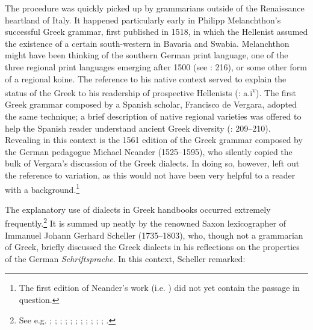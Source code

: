 The procedure was quickly picked up by grammarians outside of the Renaissance heartland of Italy. It happened particularly early in Philipp Melanchthon’s successful Greek grammar, first published in 1518, in which the  Hellenist assumed the existence of a certain south-western   in Bavaria and Swabia. Melanchthon might have been thinking of the southern German print language, one of the three regional print languages emerging after 1500 (see \citealt{Mattheier2003}: 216), or some other form of a regional koine. The reference to his native  context served to explain the status of the Greek  to his readership of prospective Hellenists (\citealt{Melanchthon1518}: a.i\textsc{\textsuperscript{v}}). The first Greek grammar composed by a Spanish scholar, Francisco de Vergara, adopted the same technique; a brief description of native regional varieties was offered to help the Spanish reader understand ancient Greek diversity (\citealt{Vergara1537}: 209–210). Revealing in this context is the 1561 edition of the Greek grammar composed by the German pedagogue Michael Neander (1525–1595), who silently copied the bulk of Vergara’s discussion of the Greek dialects. In doing so, however, \citet[340--343]{Neander1561} left out the reference to  variation, as this would not have been very helpful to a reader with a  background.\footnote{The first edition of Neander’s work (i.e. \citealt{Neander1553}) did not yet contain the passage in question.}

The explanatory use of  dialects in Greek handbooks occurred extremely frequently.\footnote{See e.g. \citet[3--4]{Schmidt1604}; \citet[83]{Rhenius1626}; \citet[\textsc{b.4}\textsc{\textsuperscript{r}}]{Schorling1678}; \citet[\textsc{b.2}\textsc{\textsuperscript{v}}]{KirchmaierCrusius1684}; \citet[376]{Kober1701}; \citet[\textsc{c.2}\textsc{\textsuperscript{v}}]{Thryllitsch1709}; \citet[b.2\textsc{\textsuperscript{v}}\textsc{–}b.3\textsc{\textsuperscript{r}}]{Nibbe1725}; \citet[141]{Georgi1733}; \citet[13]{Schuster1737}; \citet[207--209]{Simonis1752}; \citet[191--192]{Peternader1776}; \citet[\textsc{xxvi}]{Harles1778}.} It is summed up neatly by the renowned Saxon lexicographer of  Immanuel Johann Gerhard Scheller (1735–1803), who, though not a grammarian of Greek, briefly discussed the Greek dialects in his reflections on the properties of the German \textit{Schriftsprache}. In this context, Scheller remarked:

